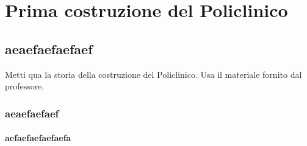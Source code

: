 \chapter{Prima costruzione del Policlinico}
\thispagestyle{empty}
\section{aeaefaefaefaef}
Metti qua la storia della costruzione del Policlinico. Usa il materiale fornito dal professore.
\subsection{aeaefaefaef}
\subsubsection{aefaefaefaefaefa}